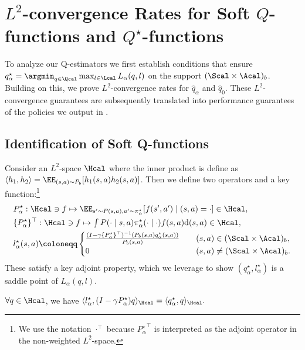 
\section{$L^2$-convergence Rates for Soft $Q$-functions and $Q^{\star}$-functions} 




To analyze our Q-estimators we first establish conditions that ensure $
 q^{\star}_{\alpha}=\argmin_{q \in \Qcal }\max_{l \in \Lcal} L_{\alpha}(q,l)$ on the support $(\Scal\times \Acal)_b$. Building on this, we prove $L^2$-convergence rates for $\hat q_{\alpha}$ and $\hat q_0$. {\newedit These $L^2$-convergence guarantees are subsequently translated into performance guarantees of the policies we output in .}


\subsection{Identification of Soft Q-functions}\label{sec:identification}


Consider an $L^2$-space $\Hcal$ where the inner product is define as $\langle h_1,h_2\rangle = \EE_{(s,a)\sim P_b}[h_1(s,a)h_2(s,a)]$.
Then we define two operators and a key function:\footnote{{\finaledit We use the notation $\cdot^{\top}$ because ${P^{\star}_{\alpha}}^{\top}$ is interpreted as the adjoint operator in the non-weighted $L^2$-space.}}
\begin{align*}
  & P^{\star}_{\alpha}   \textstyle: \Hcal \ni f \mapsto \EE_{s'\sim P(s,a),a'\sim \pi^{\star}_{\alpha}}[f(s',a')\mid (s,a)=\cdot] \in \Hcal, \\ 
   \textstyle   &  \{P^{\star}_{\alpha}\}^{\top}  \textstyle: \Hcal \ni f \mapsto \int P(\cdot \mid s,a)\pi^{\star}_{\alpha}(\cdot \mid \cdot)f(s,a)\mathrm{d}(s,a) \in \Hcal,\\
    &l^{\star}_{\alpha}(s,a) \coloneqq  \begin{cases}
         \frac{(I-\gamma \{P^{\star}_{\alpha}\}^{\top})^{-1 }(P_b(s,a)q^{\star}_{\alpha}(s,a))}{P_b(s,a)} \quad&(s,a)\in (\Scal \times \Acal)_b,  \\
         0 &(s,a)\neq (\Scal \times \Acal)_b.  
    \end{cases}
\end{align*}
These satisfy a key adjoint property, which we leverage to show $(q^{\star}_{\alpha},l^{\star}_{\alpha})$ is a saddle point of $L_{\alpha}(q,l)$.
\begin{lemma}\label{lem:adjoint}
 $\forall q\in \Hcal$, we have 
$\langle  l^{\star}_{\alpha} , (I-\gamma P^{\star}_{\alpha}) q \rangle_{\Hcal} = \langle  q^{\star}_{\alpha}, q \rangle _{\Hcal}. $
\end{lemma}

